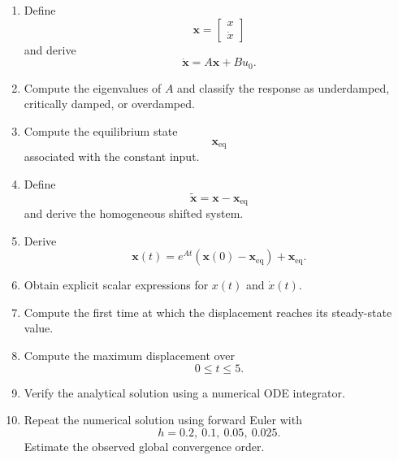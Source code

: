 \begin{enumerate}
    \item Define
    \begin{equation}
    \mathbf{x}
    =
    \begin{bmatrix}
    x\\
    \dot{x}
    \end{bmatrix}
    \end{equation}
    and derive
    \begin{equation}
    \dot{\mathbf{x}}
    =
    A\mathbf{x}
    +
    B u_0.
    \end{equation}

    \item Compute the eigenvalues of $A$ and classify the response as
    underdamped, critically damped, or overdamped.

    \item Compute the equilibrium state
    \begin{equation}
    \mathbf{x}_{\mathrm{eq}}
    \end{equation}
    associated with the constant input.

    \item Define
    \begin{equation}
    \widetilde{\mathbf{x}}
    =
    \mathbf{x}
    -
    \mathbf{x}_{\mathrm{eq}}
    \end{equation}
    and derive the homogeneous shifted system.

    \item Derive
    \begin{equation}
    \mathbf{x}(t)
    =
    e^{At}
    \left(
    \mathbf{x}(0)-\mathbf{x}_{\mathrm{eq}}
    \right)
    +
    \mathbf{x}_{\mathrm{eq}}.
    \end{equation}

    \item Obtain explicit scalar expressions for $x(t)$ and $\dot{x}(t)$.

    \item Compute the first time at which the displacement reaches its
    steady-state value.

    \item Compute the maximum displacement over
    \begin{equation}
    0\leq t\leq5.
    \end{equation}

    \item Verify the analytical solution using a numerical ODE integrator.

    \item Repeat the numerical solution using forward Euler with
    \begin{equation}
    h=0.2,\ 0.1,\ 0.05,\ 0.025.
    \end{equation}
    Estimate the observed global convergence order.
\end{enumerate}


